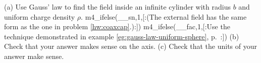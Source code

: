 (a) Use Gauss' law to find the field inside an
        infinite cylinder with radius $b$ and uniform
        charge density $\rho$. 
m4_ifelse(__sn,1,[:(The external field has the same form as
        the one in problem \ref{hw:coaxcap}.):])%
m4_ifelse(__fac,1,[:Use the technique demonstrated in example \ref{eg:gauss-law-uniform-sphere},
        p.~\pageref{eg:gauss-law-uniform-sphere}:])%
\answercheck\hwendpart
(b) Check that your answer makes sense on the axis.\hwendpart
(c) Check that the units of your answer make sense.

